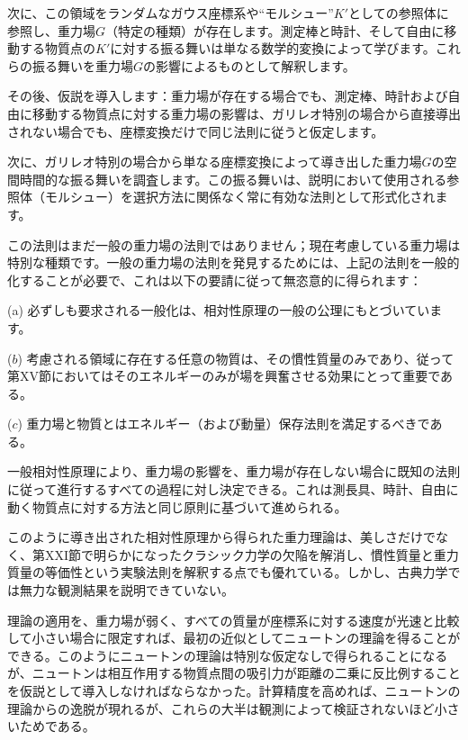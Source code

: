 \documentclass[a4paper,11pt,openany]{ltjsbook}
\begin{document}
次に、この領域をランダムなガウス座標系や“モルシュー”$K′$としての参照体に参照し、重力場$G$（特定の種類）が存在します。測定棒と時計、そして自由に移動する物質点の$K′$に対する振る舞いは単なる数学的変換によって学びます。これらの振る舞いを重力場$G$の影響によるものとして解釈します。

その後、仮説を導入します：重力場が存在する場合でも、測定棒、時計および自由に移動する物質点に対する重力場の影響は、ガリレオ特別の場合から直接導出されない場合でも、座標変換だけで同じ法則に従うと仮定します。

次に、ガリレオ特別の場合から単なる座標変換によって導き出した重力場$G$の空間時間的な振る舞いを調査します。この振る舞いは、説明において使用される参照体（モルシュー）を選択方法に関係なく常に有効な法則として形式化されます。

この法則はまだ一般の重力場の法則ではありません；現在考慮している重力場は特別な種類です。一般の重力場の法則を発見するためには、上記の法則を一般的化することが必要で、これは以下の要請に従って無恣意的に得られます：

(a) 必ずしも要求される一般化は、相対性原理の一般の公理にもとづいています。

($b$) 考慮される領域に存在する任意の物質は、その慣性質量のみであり、従って第XV節においてはそのエネルギーのみが場を興奮させる効果にとって重要である。

($c$) 重力場と物質とはエネルギー（および動量）保存法則を満足するべきである。

一般相対性原理により、重力場の影響を、重力場が存在しない場合に既知の法則に従って進行するすべての過程に対し決定できる。これは測長具、時計、自由に動く物質点に対する方法と同じ原則に基づいて進められる。

このように導き出された相対性原理から得られた重力理論は、美しさだけでなく、第XXI節で明らかになったクラシック力学の欠陥を解消し、慣性質量と重力質量の等価性という実験法則を解釈する点でも優れている。しかし、古典力学では無力な観測結果を説明できていない。

理論の適用を、重力場が弱く、すべての質量が座標系に対する速度が光速と比較して小さい場合に限定すれば、最初の近似としてニュートンの理論を得ることができる。このようにニュートンの理論は特別な仮定なしで得られることになるが、ニュートンは相互作用する物質点間の吸引力が距離の二乗に反比例することを仮説として導入しなければならなかった。計算精度を高めれば、ニュートンの理論からの逸脱が現れるが、これらの大半は観測によって検証されないほど小さいためである。
\end{document}
